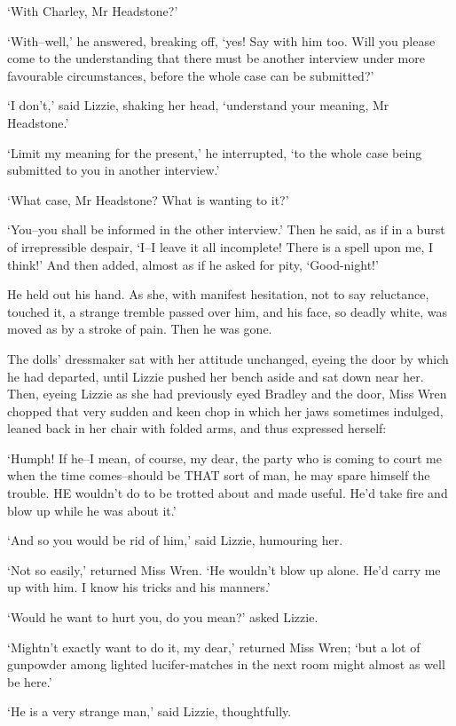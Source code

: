 ‘With Charley, Mr Headstone?’

‘With--well,’ he answered, breaking off, ‘yes! Say with him too.
Will you please come to the understanding that there must be another
interview under more favourable circumstances, before the whole case can
be submitted?’

‘I don’t,’ said Lizzie, shaking her head, ‘understand your meaning, Mr
Headstone.’

‘Limit my meaning for the present,’ he interrupted, ‘to the whole case
being submitted to you in another interview.’

‘What case, Mr Headstone? What is wanting to it?’

‘You--you shall be informed in the other interview.’ Then he said, as
if in a burst of irrepressible despair, ‘I--I leave it all incomplete!
There is a spell upon me, I think!’ And then added, almost as if he
asked for pity, ‘Good-night!’

He held out his hand. As she, with manifest hesitation, not to say
reluctance, touched it, a strange tremble passed over him, and his face,
so deadly white, was moved as by a stroke of pain. Then he was gone.

The dolls’ dressmaker sat with her attitude unchanged, eyeing the door
by which he had departed, until Lizzie pushed her bench aside and sat
down near her. Then, eyeing Lizzie as she had previously eyed Bradley
and the door, Miss Wren chopped that very sudden and keen chop in which
her jaws sometimes indulged, leaned back in her chair with folded arms,
and thus expressed herself:

‘Humph! If he--I mean, of course, my dear, the party who is coming to
court me when the time comes--should be THAT sort of man, he may spare
himself the trouble. HE wouldn’t do to be trotted about and made useful.
He’d take fire and blow up while he was about it.’

‘And so you would be rid of him,’ said Lizzie, humouring her.

‘Not so easily,’ returned Miss Wren. ‘He wouldn’t blow up alone. He’d
carry me up with him. I know his tricks and his manners.’

‘Would he want to hurt you, do you mean?’ asked Lizzie.

‘Mightn’t exactly want to do it, my dear,’ returned Miss Wren; ‘but a
lot of gunpowder among lighted lucifer-matches in the next room might
almost as well be here.’

‘He is a very strange man,’ said Lizzie, thoughtfully.

